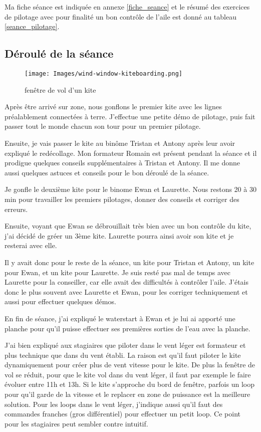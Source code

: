 \documentclass[11pt,a4paper]{report}
\begin{document}
Ma fiche séance est indiquée en annexe \ref{fiche_seance}
et le résumé des exercices de pilotage avec pour
finalité un bon contr\^ole de l'aile est donné
au tableau \ref{seance_pilotage}.

\subsection{Déroulé de la séance}
\begin{figure}
\centering
\texttt{[image: Images/wind-window-kiteboarding.png]}
\caption{fen\^etre de vol d'un kite\label{fenetre}}
\end{figure} 

Après \^etre arrivé sur zone, nous gonflons le premier kite avec les
lignes préalablement connectées à terre. J'effectue une petite démo
de pilotage, puis fait passer tout le monde chacun son tour pour
un premier pilotage.

Ensuite, je vais passer le kite au binôme Tristan et Antony après leur
avoir expliqué le redécollage. Mon formateur Romain est présent pendant la
séance et il prodigue quelques conseils supplémentaires à Tristan et Antony.
Il me donne aussi quelques astuces et conseils pour le bon déroulé de la séance.

Je gonfle le deuxième kite pour le binome Ewan et Laurette.
Nous restons 20 à 30 min pour travailler les premiers pilotages,
donner des conseils et corriger des erreurs.

Ensuite, voyant que Ewan se débrouillait très bien avec un bon contrôle du 
kite, j'ai décidé de gréer un 3ème kite. Laurette pourra ainsi avoir son kite
et je resterai avec elle.

Il y avait donc pour le reste de la séance, un kite pour Tristan et Antony, 
un kite pour Ewan, et un kite pour Laurette. Je suis resté pas mal de temps
avec Laurette pour la conseiller, car elle avait des difficultés à contrôler l'aile.
J'étais donc le plus souvent avec Laurette et Ewan, pour les corriger techniquement 
et aussi pour effectuer quelques démos.

En fin de séance, j'ai expliqué le waterstart à Ewan et je lui ai
apporté une planche pour qu'il puisse effectuer ses premières sorties
de l'eau avec la planche.

J'ai bien expliqué aux stagiaires que piloter dans le vent léger est
formateur et plus technique que dans du vent établi. La raison est qu'il faut
piloter le kite dynamiquement pour créer plus de vent vitesse pour le kite.
De plus la fen\^etre de vol se réduit, pour que le kite vol dans du vent léger, 
il faut par exemple le faire évoluer entre 11h et 13h. Si le kite s'approche du 
bord de fen\^etre, parfois un loop pour qu'il garde de la vitesse et le replacer
en zone de puissance est la meilleure solution.
Pour les loops dans le vent léger, j'indique aussi qu'il faut
des commandes franches (gros différentiel) pour effectuer un petit loop.
Ce point pour les stagiaires peut sembler contre intuitif.
\end{document}
